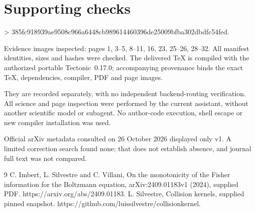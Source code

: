 \documentclass[10pt]{article}
\begin{document}
\section*{Supporting checks}
> 385fc918939ae9508c966a6448cb989614460396de25009bfba302dbdfc54fed.\par
Evidence images inspected: pages 1, 3–5, 8–11, 16, 23, 25–26, 28–32. All manifest identities, sizes and hashes were checked. The delivered TeX is compiled with the authorized portable Tectonic 0.17.0; accompanying provenance binds the exact TeX, dependencies, compiler, PDF and page images.\par
They are recorded separately, with no independent backend-routing verification. All science and page inspection were performed by the current assistant, without another scientific model or subagent. No author-code execution, shell escape or new compiler installation was used.\par
Official arXiv metadata consulted on 26 October 2026 displayed only v1. A limited correction search found none; that does not establish absence, and journal full text was not compared.\par
9 C. Imbert, L. Silvestre and C. Villani, On the monotonicity of the Fisher information for the Boltzmann equation, arXiv:2409.01183v1 (2024), supplied PDF. https://arxiv.org/abs/2409.01183. L. Silvestre, Collision kernels, supplied pinned snapshot. https://github.com/luissilvestre/collisionkernel.\par
\end{document}
